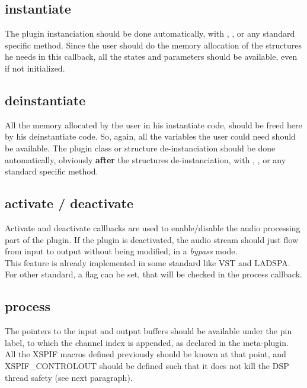 \subsection{instantiate}
\noindent The plugin instanciation should be done automatically, with
, , or any standard specific method. Since the
user should do the memory allocation of the structures he needs in
this callback, all the states and parameters should be available, even
if not initialized.\\ 

\subsection{deinstantiate}
\noindent All the memory allocated by the user in his instantiate
code, should be freed here by his deinstantiate code. So, again, all
the variables the user could need should be available. The plugin
class or structure de-instanciation should be done automatically,
obviously \textbf{after} the structures de-instanciation, with
, , or any standard specific method.\\ 

\subsection{activate / deactivate}
\noindent Activate and deactivate callbacks are used to enable/disable
the audio processing part of the plugin. If the plugin is deactivated,
the audio stream should just flow from input to output without being
modified, in a \emph{bypass} mode.\\ 
\noindent This feature is already implemented in some standard like
VST and LADSPA. For other standard, a flag can be set, that will be
checked in the process callback.\\ 

\subsection{process}
\noindent The pointers to the input and output buffers should be
available under the pin label, to which the channel index is appended,
as declared in the meta-plugin.\\ 
\noindent All the XSPIF macros defined previously should be known at
that point, and XSPIF\_CONTROLOUT should be defined such that it does
not kill the DSP thread safety (see next paragraph).\\ 

